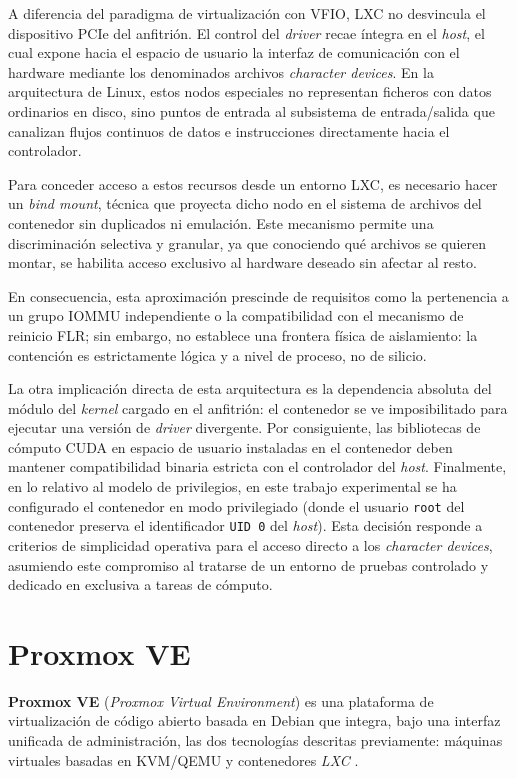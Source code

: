 A diferencia del paradigma de virtualización con VFIO, LXC no desvincula el dispositivo PCIe del anfitrión. El control del 
\textit{driver} recae íntegra en el \textit{host}, el cual expone hacia el espacio de usuario la interfaz de comunicación con 
el hardware mediante los denominados archivos \textit{character devices}. 
En la arquitectura de Linux, estos nodos especiales no representan ficheros 
con datos ordinarios en disco, sino puntos de entrada al subsistema de entrada/salida que canalizan flujos continuos de datos 
e instrucciones directamente hacia el controlador. 

Para conceder acceso a estos recursos desde un entorno LXC, es necesario hacer un \textit{bind mount}, 
técnica que proyecta dicho nodo en el sistema de archivos del contenedor sin duplicados ni emulación. Este 
mecanismo permite una discriminación selectiva y granular, ya que conociendo qué archivos se quieren montar, se habilita
acceso exclusivo al hardware deseado sin afectar al resto.

En consecuencia, esta aproximación prescinde de requisitos como la pertenencia a un grupo IOMMU independiente o la 
compatibilidad con el mecanismo de reinicio FLR; sin embargo, no establece una frontera física de aislamiento: la contención 
es estrictamente lógica y a nivel de proceso, no de silicio.

La otra implicación directa de esta arquitectura es la dependencia absoluta del módulo del \textit{kernel} cargado en el anfitrión: el 
contenedor se ve imposibilitado para ejecutar una versión de \textit{driver} divergente. Por consiguiente, las bibliotecas de 
cómputo CUDA en espacio de usuario instaladas en el contenedor deben mantener compatibilidad binaria estricta con el controlador 
del \textit{host}. 
Finalmente, en lo relativo al modelo de privilegios, en este trabajo experimental se ha configurado el contenedor en modo 
privilegiado (donde el usuario \texttt{root} del contenedor preserva el identificador \texttt{UID 0} del \textit{host}). Esta 
decisión responde a criterios de simplicidad operativa para el acceso directo a los \textit{character devices},
asumiendo este compromiso al tratarse de un entorno de pruebas controlado y dedicado en exclusiva a tareas de cómputo.

\section{Proxmox VE}

\textbf{Proxmox VE} (\textit{Proxmox Virtual Environment}) es una plataforma de virtualización de 
código abierto basada en Debian que integra, bajo una interfaz unificada de administración, las 
dos tecnologías descritas previamente: máquinas virtuales basadas en KVM/QEMU y contenedores 
\textit{LXC} \cite{proxmox_ve}.

